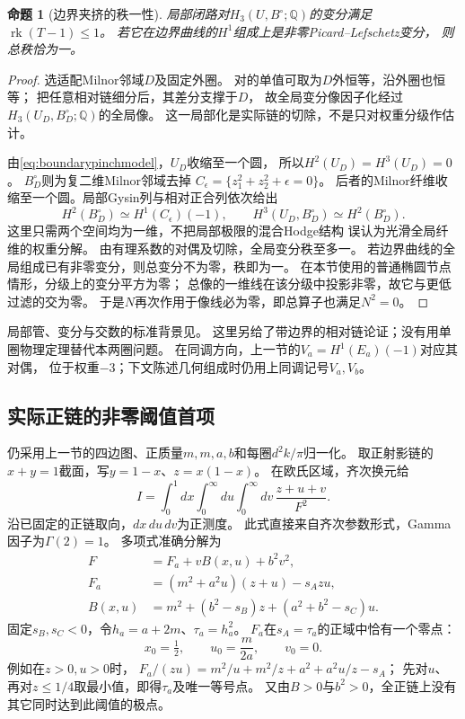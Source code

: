 \documentclass[11pt,a4paper]{ctexart}
\theoremstyle{cnplain}\newtheorem{theorem}{定理}[section]
\newtheorem{proposition}[theorem]{命题}
\theoremstyle{definition}\newtheorem{definition}[theorem]{定义}
\theoremstyle{remark}\newtheorem{remark}[theorem]{注}
\newcommand{\Q}{\mathbb Q}\newcommand{\cC}{\mathcal C}
\newcommand{\rk}{\operatorname{rk}}\newcommand{\im}{\operatorname{im}}
\begin{document}
\begin{proposition}[边界夹挤的秩一性]\label{prop:boundaryrankone}
局部闭路对$H_3(U,B^\circ;\Q)$的变分满足$\rk(T-1)\leq1$。
若它在边界曲线的$H^1$组成上是非零Picard--Lefschetz变分，
则总秩恰为一。
\end{proposition}
\begin{proof}
选适配Milnor邻域$D$及固定外圈。
对的单值可取为$D$外恒等，沿外圈也恒等；
把任意相对链细分后，其差分支撑于$D$，
故全局变分像因子化经过
$H_3(U_D,B_D^\circ;\Q)$的全局像。
这一局部化是实际链的切除，不是只对权重分级作估计。

由\eqref{eq:boundarypinchmodel}，$U_D$收缩至一个圆，
所以$H^2(U_D)=H^3(U_D)=0$。
$B_D^\circ$则为复二维Milnor邻域去掉
$C_\epsilon=\{z_1^2+z_2^2+\epsilon=0\}$。
后者的Milnor纤维收缩至一个圆。局部Gysin列与相对正合列依次给出
\[
 H^2(B_D^\circ)\simeq H^1(C_\epsilon)(-1),\qquad
 H^3(U_D,B_D^\circ)\simeq H^2(B_D^\circ).
\]
这里只需两个空间均为一维，不把局部极限的混合Hodge结构
误认为光滑全局纤维的权重分解。
由有理系数的对偶及切除，全局变分秩至多一。
若边界曲线的全局组成已有非零变分，则总变分不为零，秩即为一。
在本节使用的普通椭圆节点情形，分级上的变分平方为零；
总像的一维线在该分级中投影非零，故它与更低过滤的交为零。
于是$N$再次作用于像线必为零，即总算子也满足$N^2=0$。
\end{proof}

局部管、变分与交数的标准背景见\cite[\S2.3]{muhl}。
这里另给了带边界的相对链论证；没有用单圈物理定理替代本两圈问题。
在同调方向，上一节的$V_a=H^1(E_a)(-1)$对应其对偶，
位于权重$-3$；下文陈述几何组成时仍用上同调记号$V_a,V_b$。

\subsection{实际正链的非零阈值首项}
仍采用上一节的四边图、正质量$m,m,a,b$和每圈$d^2k/\pi$归一化。
取正射影链的$x+y=1$截面，写$y=1-x$、$z=x(1-x)$。
在欧氏区域，齐次换元给
\begin{equation}\label{eq:scalaricechart}
 I=\int_0^1dx\int_0^\infty du\int_0^\infty dv\,
       \frac{z+u+v}{F^2}.
\end{equation}
沿已固定的正链取向，$dx\,du\,dv$为正测度。
此式直接来自齐次参数形式，Gamma因子为$\Gamma(2)=1$。
多项式准确分解为
\begin{align}
 F&=F_a+vB(x,u)+b^2v^2,\label{eq:scalariceexpand}\\
 F_a&=(m^2+a^2u)(z+u)-s_Azu,\nonumber\\
 B(x,u)&=m^2+(b^2-s_B)z+(a^2+b^2-s_C)u.\nonumber
\end{align}
固定$s_B,s_C<0$，令$h_a=a+2m$、$\tau_a=h_a^2$。
$F_a$在$s_A=\tau_a$的正域中恰有一个零点：
\[
 x_0=\tfrac12,\qquad u_0=\frac{m}{2a},\qquad v_0=0.
\]
例如在$z>0,u>0$时，
$F_a/(zu)=m^2/u+m^2/z+a^2+a^2u/z-s_A$；
先对$u$、再对$z\leq1/4$取最小值，即得$\tau_a$及唯一等号点。
又由$B>0$与$b^2>0$，全正链上没有其它同时达到此阈值的极点。
\end{document}
